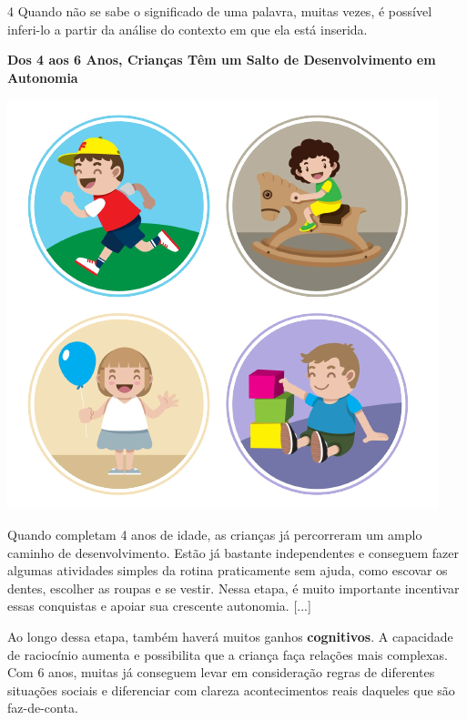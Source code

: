 \num{4} Quando não se sabe o significado de uma palavra, muitas vezes, é
possível inferi-lo a partir da análise do contexto em que ela está
inserida.

\begin{myquote}
\textbf{Dos 4 aos 6 Anos, Crianças Têm um Salto de Desenvolvimento em Autonomia}

\begin{center}
\includegraphics[width=.8\textwidth]{media/image49.png}
\end{center}

Quando completam 4 anos de idade, as crianças já percorreram um amplo
caminho de desenvolvimento. Estão já bastante independentes e conseguem
fazer algumas atividades simples da rotina praticamente sem ajuda, como
escovar os dentes, escolher as roupas e se vestir. Nessa etapa, é muito
importante incentivar essas conquistas e apoiar sua crescente autonomia.
{[}...{]}

Ao longo dessa etapa, também haverá muitos ganhos \textbf{cognitivos}. A
capacidade de raciocínio aumenta e possibilita que a criança faça
relações mais complexas. Com 6 anos, muitas já conseguem levar em
consideração regras de diferentes situações sociais e diferenciar com
clareza acontecimentos reais daqueles que são faz-de-conta.

\end{myquote}


